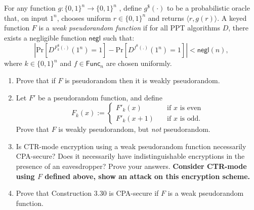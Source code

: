 \documentclass[a4paper,10pt,landscape,twocolumn]{scrartcl}
\begin{document}
\begin{bonusexercise}
  For any function $g : \{0, 1\}^n \to \{0, 1\}^n$ , define $g^{\$} (·)$ to be a probabilistic oracle that, on input $1^n$, chooses uniform $r \in \{0, 1\}^n$ and returns $\langle r, g(r)\rangle$. A keyed function $F$ is a \emph{weak pseudorandom function} if for all PPT algorithms $D$, there exists a negligible function $\mathsf{negl}$ such that:
  \begin{equation}
  \left\lvert  \text{Pr}[ D^{F_k^{\$}(.)}(1^n)=1 ]-\text{Pr}[ D^{f^{\$}(.)}(1^n)=1 ]  \right\rvert < \mathsf{negl}(n),
  \end{equation}
where $k \in \{0, 1\}^n$ and $f \in \mathsf{Func}_n$ are chosen uniformly.
\begin{enumerate}[label=(\alph*)]
\item Prove that if $F$ is pseudorandom then it is weakly pseudorandom.
\item Let $F'$ be a pseudorandom function, and define
\begin{equation}
F_k(x):=\begin{cases}
    F'_k(x)     & \quad \text{if } x \text{ is even}\\
    F'_k(x+1)  & \quad \text{if } x \text{ is odd.}
  \end{cases}
\end{equation}
Prove that $F$ is weakly pseudorandom, but \emph{not} pseudorandom.
\item Is CTR-mode encryption using a weak pseudorandom function necessarily CPA-secure? Does it necessarily have indistinguishable encryptions in the presence of an eavesdropper? Prove your answers. \textbf{Consider CTR-mode using $F$ defined above, show an attack on this encryption scheme.}
\item Prove that Construction 3.30 is CPA-secure if $F$ is a weak pseudorandom function.
\end{enumerate}
\end{bonusexercise}
\end{document}
